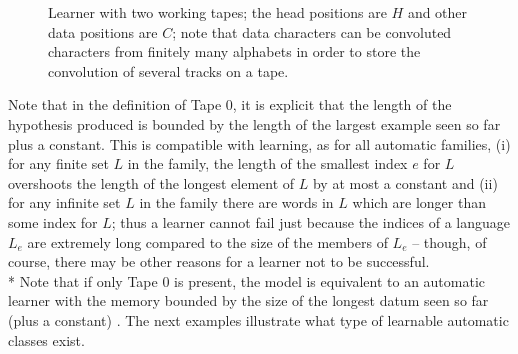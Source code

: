\documentclass{LMCS}
\theoremstyle{plain}\newtheorem{athm}[thm]{Theorem}
\theoremstyle{plain}\newtheorem{aprop}[thm]{Proposition}
\theoremstyle{plain}\newtheorem{aprob}[thm]{Open Problem}
\theoremstyle{plain}\newtheorem{acor}[thm]{Corollary}
\theoremstyle{plain}\newtheorem{alem}[thm]{Lemma}
\theoremstyle{definition}\newtheorem{adefn}[thm]{Definition}
\theoremstyle{definition}\newtheorem{arem}[thm]{Remark}
\theoremstyle{plain}\newtheorem{aexmp}[thm]{Example}
\theoremstyle{plain}\newtheorem{aclm}[thm]{Claim}
\def\sp{\\*\indent}
\begin{document}
\begin{figure}[t]
\caption{Learner with two working tapes; the head positions are $H$ and other
   data positions are $C$; note that data characters can be convoluted
   characters from finitely many alphabets in order to store the convolution
   of several tracks on a tape.} \label{figdefnlearner}
\end{figure}


\noindent
Note that in the definition of Tape $0$, it is explicit that the length of
the hypothesis produced is bounded by the length of the largest
example seen so far plus a constant. This is compatible with learning, as 
for all automatic families, (i) for any finite set $L$ in the family,
the length of the smallest index $e$ for $L$ overshoots the length 
of the longest element of $L$ by at most a constant
and (ii) for any infinite set $L$ in the family
there are words in $L$ which are longer than some index for $L$;
thus a learner cannot fail just because
the indices of a language $L_e$ are extremely long compared
to the size of the members of $L_e$ -- though, of course, there may be other
reasons for a learner not to be successful.
\sp
Note that if
only Tape $0$ is present, the model is equivalent to an automatic learner
with the memory bounded by the size of the longest datum seen so
far (plus a constant) \cite{CJLOSS11,JLS09}. The next examples illustrate
what type of learnable automatic classes exist.
\end{document}
